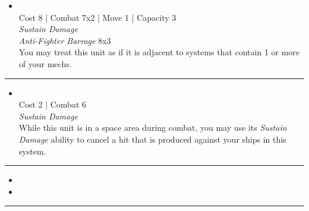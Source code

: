 \begin{multicols}{2}

\begin{itemize}
\item {}\\
Cost 8 | Combat 7x2 | Move 1 | Capacity 3 \\
\emph{Sustain Damage}\\
\emph{Anti-Fighter Barrage} 8x3\\
You may treat this unit as if it is adjacent to systems that contain 1 or more of your mechs.
\end{itemize}

\vspace{-10pt}\rule{\hsize}{0.4pt}\vspace{5pt}


\begin{itemize}
\item {}
\\
Cost 2 | Combat 6 \\
\emph{Sustain Damage}\\
While this unit is in a space area during combat, you may use its \emph{Sustain Damage} ability to cancel a hit that is produced against your ships in this system. 
\end{itemize}

\vspace{-10pt}\rule{\hsize}{0.4pt}\vspace{5pt}

\nounits

\columnbreak
{}

\begin{itemize}
\item \memoriaII
\item \commandSuite
\end{itemize}

\vspace{-10pt}\rule{\hsize}{0.4pt}\vspace{5pt}



\end{multicols}
